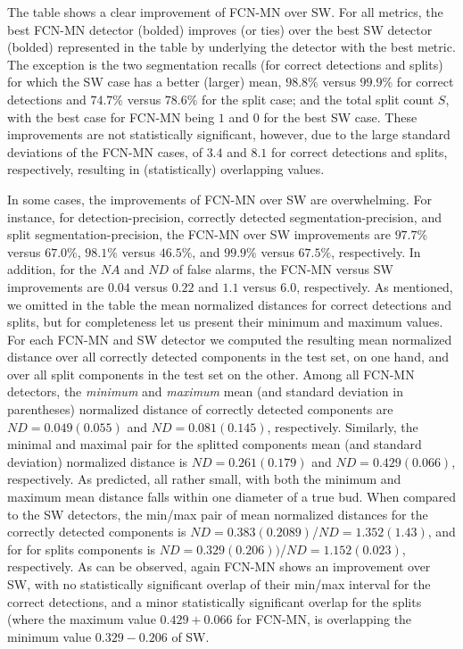 \documentclass[a4paper,authoryear,review]{elsarticle}
\begin{document}
	The table shows a clear improvement of FCN-MN over SW. For all metrics, the best  FCN-MN detector (bolded) improves (or ties) over the best SW detector (bolded) represented in the table by underlying the detector with the best metric. The exception is the two segmentation recalls (for correct detections and splits) for which the SW case has a better (larger) mean, $98.8\%$ versus $99.9\%$ for correct detections and $74.7\%$ versus $78.6\%$ for the split case; and the total split count $S$, with the best case for FCN-MN being $1$ and $0$ for the best SW case. These improvements are not statistically significant, however, due to the large standard deviations of the FCN-MN cases, of $3.4$ and $8.1$ for correct detections and splits, respectively,  resulting in (statistically) overlapping values. 
	
	In some cases, the improvements of FCN-MN over SW are overwhelming. For instance, for detection-precision, correctly detected segmentation-precision, and split segmentation-precision, the FCN-MN over SW improvements are $97.7\%$ versus $67.0\%$, $98.1\%$ versus $46.5\%$, and $99.9\%$ versus $67.5\%$, respectively.  In addition, for the $NA$ and $ND$ of false alarms, the  FCN-MN versus SW improvements are $0.04$ versus $0.22$ and $1.1$ versus $6.0$, respectively. 
	As mentioned, we omitted in the table the mean normalized distances for correct detections and splits, but for completeness let us present their minimum and maximum values.
	For each FCN-MN and SW detector we computed the resulting mean normalized distance over all correctly detected components in the test set, on one hand, and over all split components in the test set on the other. 
	Among all FCN-MN detectors, the \emph{minimum} and  \emph{maximum} mean (and standard deviation in parentheses) normalized distance of correctly detected components are $ND=0.049(0.055)$ and $ND=0.081(0.145)$, respectively. Similarly, the minimal and maximal pair for the splitted components mean (and standard deviation) normalized distance is $ND=0.261(0.179)$ and $ND=0.429(0.066)$, respectively. As predicted, all rather small, with both the minimum and maximum mean distance falls within one diameter of a true bud.
	When compared to the SW detectors, the min/max pair of mean normalized distances for the correctly detected components is $ND=0.383(0.2089)$/$ND=1.352(1.43)$, and for for splits components is $ND=0.329(0.206))$/$ND=1.152(0.023)$, respectively. As can be observed, again FCN-MN shows an improvement over SW, with no statistically significant overlap of their min/max interval for the correct detections, and a minor statistically significant overlap for the splits (where the maximum value $0.429 + 0.066$ for FCN-MN,  is overlapping the minimum value $0.329-0.206$ of SW.
	
\end{document}

